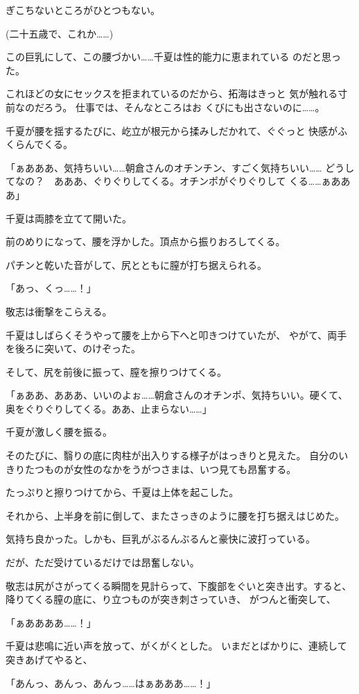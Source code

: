 ﻿\documentclass[
    book,tate,
    line_length=30zw,
    jafontsize=12pt,
    paper=b5j,
    landscape,
    ]{jlreq}
\begin{document}
ぎこちないところがひとつもない。

(二十五歳で、これか……)

この巨乳にして、この腰づかい……千夏は性的能力に恵まれている
のだと思った。

これほどの女にセックスを拒まれているのだから、拓海はきっと
気が触れる寸前なのだろう。
仕事では、そんなところはお くびにも出さないのに……。

千夏が腰を揺するたびに、屹立が根元から揉みしだかれて、ぐぐっと
快感がふくらんでくる。

「ぁあああ、気持ちいい……朝倉さんのオチンチン、すごく気持ちいい……
どうしてなの？　あああ、ぐりぐりしてくる。オチンポがぐりぐりして
くる……ぁあああ」

千夏は両膝を立てて開いた。

前のめりになって、腰を浮かした。頂点から振りおろしてくる。

パチンと乾いた音がして、尻とともに膣が打ち据えられる。

「あっ、くっ……！」

敬志は衝撃をこらえる。

千夏はしばらくそうやって腰を上から下へと叩きつけていたが、
やがて、両手を後ろに突いて、のけぞった。

そして、尻を前後に振って、膣を擦りつけてくる。

「ぁああ、あああ、いいのよぉ……朝倉さんのオチンポ、気持ちいい。硬くて、
奥をぐりぐりしてくる。ああ、止まらない……」

千夏が激しく腰を振る。

そのたびに、翳りの底に肉柱が出入りする様子がはっきりと見えた。
自分のいきりたつものが女性のなかをうがつさまは、いつ見ても昂奮する。

たっぷりと擦りつけてから、千夏は上体を起こした。

それから、上半身を前に倒して、またさっきのように腰を打ち据えはじめた。

気持ち良かった。しかも、巨乳がぶるんぶるんと豪快に波打っている。

だが、ただ受けているだけでは昂奮しない。

敬志は尻がさがってくる瞬間を見計らって、下腹部をぐいと突き出す。すると、
降りてくる膣の底に、り立つものが突き刺さっていき、 
がつんと衝突して、

「ぁああああ……！」

千夏は悲鳴に近い声を放って、がくがくとした。
いまだとばかりに、連続して突きあげてやると、

「あんっ、あんっ、あんっ……はぁあああ……！」
\end{document}
